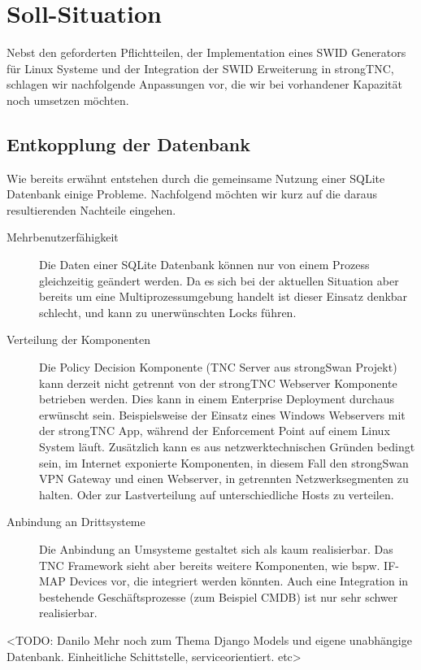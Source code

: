 \section{Soll-Situation}
Nebst den geforderten Pflichtteilen, der Implementation eines SWID Generators
für Linux Systeme und der Integration der SWID Erweiterung in strongTNC,
schlagen wir nachfolgende Anpassungen vor, die wir bei vorhandener Kapazität
noch umsetzen möchten.

\subsection{Entkopplung der Datenbank}
Wie bereits erwähnt entstehen durch die gemeinsame Nutzung einer SQLite
Datenbank einige Probleme. Nachfolgend möchten wir kurz auf die daraus
resultierenden Nachteile eingehen.

\begin{description}
	\item[Mehrbenutzerfähigkeit] Die Daten einer SQLite Datenbank können nur von
	einem Prozess gleichzeitig geändert werden. Da es sich bei der aktuellen
	Situation aber bereits um eine Multiprozessumgebung handelt ist dieser Einsatz
	denkbar schlecht, und kann zu unerwünschten Locks führen.

	\item[Verteilung der Komponenten] Die Policy Decision Komponente (TNC Server
	aus strongSwan Projekt) kann derzeit nicht getrennt von der strongTNC Webserver
	Komponente betrieben werden. Dies kann in einem Enterprise Deployment
	durchaus erwünscht sein. Beispielsweise der Einsatz eines Windows Webservers
	mit der strongTNC App, während der Enforcement Point auf einem Linux System
	läuft. Zusätzlich kann es aus netzwerktechnischen Gründen bedingt sein, im
	Internet exponierte Komponenten, in diesem Fall den strongSwan VPN Gateway und
	einen Webserver, in getrennten Netzwerksegmenten zu halten. Oder zur
	Lastverteilung auf unterschiedliche Hosts zu verteilen.

	\item[Anbindung an Drittsysteme] Die Anbindung an Umsysteme gestaltet sich als
	kaum realisierbar. Das TNC Framework sieht aber bereits weitere Komponenten,
	wie bspw. IF-MAP Devices vor, die integriert werden könnten. Auch eine
	Integration in bestehende Geschäftsprozesse (zum Beispiel CMDB) ist nur sehr
	schwer realisierbar.
\end{description} 

<TODO: Danilo Mehr noch zum Thema Django Models und eigene unabhängige Datenbank.
Einheitliche Schittstelle, serviceorientiert. etc>

